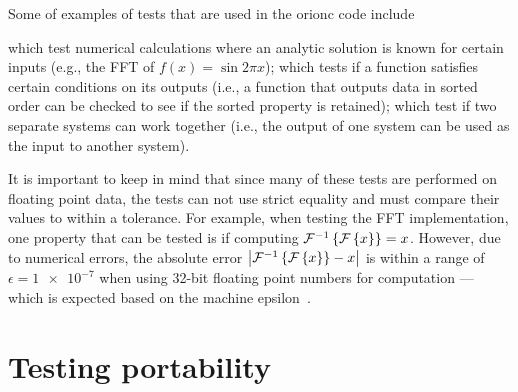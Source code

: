 Some of examples of tests that are used in the \gls{orionc} code include
\begin{enumerate*}[label={}]
	 which test numerical
		calculations where an analytic solution is known
		for certain inputs (e.g., the \acrshort{FFT} of
		\(f(x) = \sin 2\pi{}x\));
	 which tests if a function
		satisfies certain conditions on its outputs (i.e.,
		a function that outputs data in sorted order can
		be checked to see if the sorted property is
		retained);
	 which test if two
		separate systems can work together (i.e., the
		output of one system can be used as the input to
		another system).
\end{enumerate*}

It is important to keep in mind that since many of these tests are
performed on floating point data, the tests can not use strict
equality and must compare their values to within a tolerance. For
example, when testing the \acrshort{FFT} implementation, one property that
can be tested is if computing \(\mathcal{F}^{-1}\left\{\mathcal{F}\left\{x\right\}\right\} =
x\). However, due to numerical errors, the absolute error \(\left| \mathcal{F}^{-1}\left\{\mathcal{F}\left\{x\right\}\right\} -
x \right|\) is within a range of \(\epsilon = \num{1e-7}\) when
using 32-bit floating point numbers for
computation --- which is expected based on the machine epsilon~\autocite{fftw:accuracy-bench,Tashce:FFT-error}.

\section{Testing portability}

